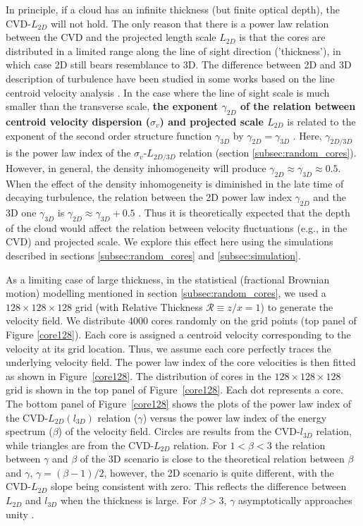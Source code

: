 \documentclass[iop,revtex4]{emulateapj}
\begin{document}
In principle, if a cloud has an infinite thickness (but finite optical depth), the CVD-$L_{2D}$ will not hold. The only reason that there is a power law relation between the CVD and the projected length scale $L_{2D}$ is that the cores are distributed in a limited range along the line of sight direction ('thickness'), in which case 2D still bears resemblance to 3D. The difference between 2D and 3D description of turbulence have been studied in some works based on the line centroid velocity analysis \citep[e.g.][]{Falgarone2003,Brunt2004}. In the case where the line of sight scale is much smaller than the transverse scale, {\bf the exponent $\gamma_{2D}$ of the relation between centroid velocity dispersion ($\sigma_v$) and projected scale $L_{2D}$} is related to the exponent of the second order structure function $\gamma_{3D}$ by $\gamma_{2D}=\gamma_{3D}$ \citep{Falgarone2003}. Here, $\gamma_{2D/3D}$ is the power law index of the $\sigma_v$-$L_{2D/3D}$ relation (section \ref{subsec:random_cores}). However, in general, the density inhomogeneity will produce $\gamma_{2D}\approx\gamma_{3D}\approx 0.5$. When the effect of the density inhomogeneity is diminished in the late time of decaying turbulence, the relation between the 2D power law index $\gamma_{2D}$ and the 3D one $\gamma_{3D}$ is $\gamma_{2D}\approx \gamma_{3D}+0.5$ \citep{Brunt2004}. Thus it is theoretically expected that the depth of the cloud would affect the relation between velocity fluctuations (e.g., in the CVD) and projected scale. We explore this effect here using the simulations described in sections \ref{subsec:random_cores} and \ref{subsec:simulation}.




As a limiting case of large thickness, in the statistical (fractional Brownian motion) modelling mentioned in section \ref{subsec:random_cores}, we used a $128\times 128\times 128$ grid (with Relative Thickness $\mathcal{R}\equiv z/x=1$) to generate the velocity field. We distribute 4000 cores randomly on the grid points (top panel of Figure \ref{core128}). Each core is assigned a centroid velocity  corresponding to the velocity at its grid location. Thus, we assume each core perfectly traces the underlying velocity field. The power law index of the core velocities is then fitted as shown in Figure~\ref{core128}. The distribution of cores in the $128\times 128\times 128$ grid is shown in the top panel of Figure~\ref{core128}. Each dot represents a core. The bottom panel of Figure~\ref{core128} shows the plots of the power law index of the CVD-$L_{2D}(l_{3D})$ relation ($\gamma$) versus the power law index of the energy spectrum ($\beta$) of the velocity field. Circles are results from the CVD-$l_{3D}$ relation, while triangles are from the CVD-$L_{2D}$ relation. For $1< \beta <3$ the relation between $\gamma$ and $\beta$ of the 3D scenario is close to the theoretical relation between $\beta$ and $\gamma$, $\gamma=(\beta-1)/2$, however, the 2D scenario is quite different, with the CVD-$L_{2D}$ slope being consistent with zero. This reflects the difference between $L_{2D}$ and $l_{3D}$ when the thickness is large. For $\beta>3$, $\gamma$ asymptotically approaches unity \citep{Turbulence_Brunt2002}.
\end{document}
